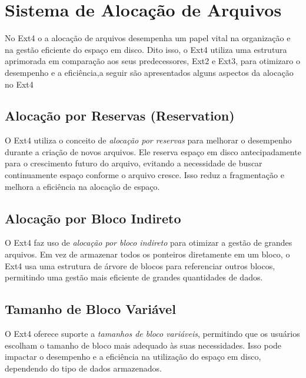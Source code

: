 \documentclass[
	12pt,				%
	openright,			%
	oneside,			%
	a4paper,			%
	chapter=TITLE,		%
	english,			%
	french,				%
	spanish,			%
	brazil				%
	]{abntex2}
\theoremstyle{definition}
\begin{document}
\chapter{Sistema de Alocação de Arquivos}
No Ext4 o a alocação de arquivos desempenha um papel vital na organização e na gestão eficiente do espaço em disco. 
Dito isso, o Ext4 utiliza uma estrutura aprimorada em comparação aos seus predecessores, Ext2 e Ext3, para otimizaro 
o desempenho e a eficiência,a seguir são apresentados alguns aspectos da alocação no Ext4


\section{Alocação por Reservas (Reservation)}
O Ext4 utiliza o conceito de \textit{alocação por reservas} para melhorar o desempenho durante a criação de novos arquivos. Ele reserva espaço em disco antecipadamente para o crescimento futuro do arquivo, evitando a necessidade de buscar continuamente espaço conforme o arquivo cresce. Isso reduz a fragmentação e melhora a eficiência na alocação de espaço.

\section{Alocação por Bloco Indireto}
O Ext4 faz uso de \textit{alocação por bloco indireto} para otimizar a gestão de grandes arquivos. Em vez de armazenar todos os ponteiros diretamente em um bloco, o Ext4 usa uma estrutura de árvore de blocos para referenciar outros blocos, permitindo uma gestão mais eficiente de grandes quantidades de dados.

\section{Tamanho de Bloco Variável}
O Ext4 oferece suporte a \textit{tamanhos de bloco variáveis}, permitindo que os usuários escolham o tamanho de bloco mais adequado às suas necessidades. Isso pode impactar o desempenho e a eficiência na utilização do espaço em disco, dependendo do tipo de dados armazenados.
\end{document}
